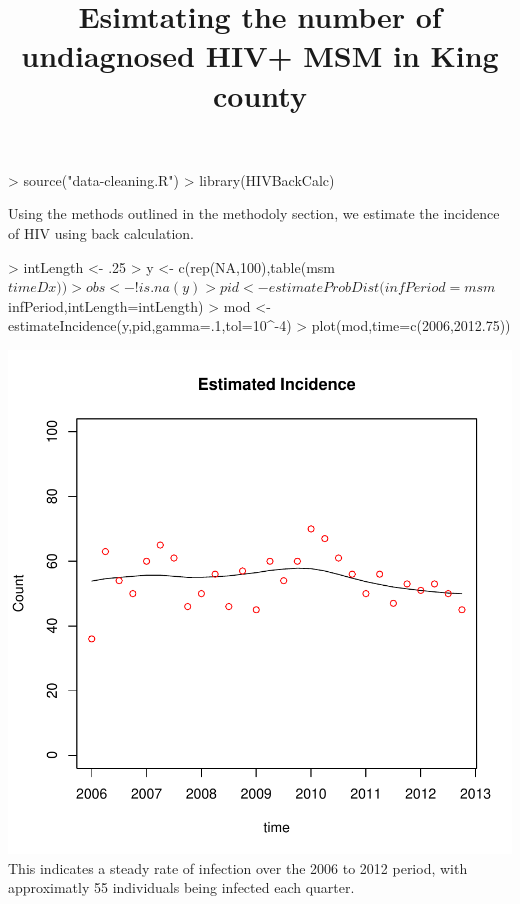 \documentclass{article}
\title{Esimtating the number of undiagnosed HIV+ MSM in King county}
\begin{document}

\maketitle
\begin{Schunk}
\begin{Sinput}
> source("data-cleaning.R")
> library(HIVBackCalc)
\end{Sinput}
\end{Schunk}

Using the methods outlined in the methodoly section, we estimate the incidence of HIV using back calculation.
\begin{Schunk}
\begin{Sinput}
> intLength <- .25
> y <- c(rep(NA,100),table(msm$timeDx))
> obs <- !is.na(y)
> pid <- estimateProbDist(infPeriod=msm$infPeriod,intLength=intLength)
> mod <- estimateIncidence(y,pid,gamma=.1,tol=10^-4)
> plot(mod,time=c(2006,2012.75))
\end{Sinput}
\end{Schunk}
\includegraphics{analysis-002}
This indicates a steady rate of infection over the 2006 to 2012 period, with approximatly 55 individuals being infected each quarter.
\end{document}
